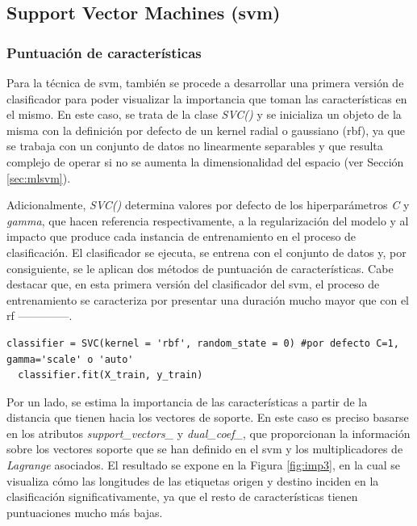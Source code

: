 \subsection{Support Vector Machines (\acrshort{svm})}
\label{sec:svm}

\subsubsection{Puntuación de características}
\label{sec:svm1}

Para la técnica de \gls{svm}, también se procede a desarrollar una primera versión de clasificador para poder visualizar la importancia que toman las características en el mismo. En este caso, se trata de la clase \textit{SVC()} \cite{svc} y se inicializa un objeto de la misma con la definición por defecto de un kernel radial o gaussiano (\gls{rbf}), ya que se trabaja con un conjunto de datos no linearmente separables y que resulta complejo de operar si no se aumenta la dimensionalidad del espacio (ver Sección \ref{sec:mlsvm}). 

\vspace{3mm}

Adicionalmente, \textit{SVC()} determina valores por defecto de los hiperparámetros \textit{C} y \textit{gamma}, que hacen referencia respectivamente, a la regularización del modelo y al impacto que produce cada instancia de entrenamiento en el proceso de clasificación. El clasificador se ejecuta, se entrena con el conjunto de datos y, por consiguiente, se le aplican dos métodos de puntuación de características. Cabe destacar que, en esta primera versión del clasificador del \gls{svm}, el proceso de entrenamiento se caracteriza por presentar una duración mucho mayor que con el \gls{rf} --------------.

\vspace{3mm}

\begin{lstlisting}[style=Python, caption={Clasificador SVM por defecto}]
  classifier = SVC(kernel = 'rbf', random_state = 0) #por defecto C=1, gamma='scale' o 'auto'
  classifier.fit(X_train, y_train)
\end{lstlisting}
  
\vspace{3mm}

Por un lado, se estima la importancia de las características a partir de la distancia que tienen hacia los vectores de soporte. En este caso es preciso basarse en los atributos \textit{support\_vectors\_} y \textit{dual\_coef\_}, que proporcionan la información sobre los vectores soporte que se han definido en el \gls{svm} y los multiplicadores de \textit{Lagrange} asociados. El resultado se expone en la Figura \ref{fig:imp3}, en la cual se visualiza cómo las longitudes de las etiquetas origen y destino inciden en la clasificación significativamente, ya que el resto de características tienen puntuaciones mucho más bajas.

